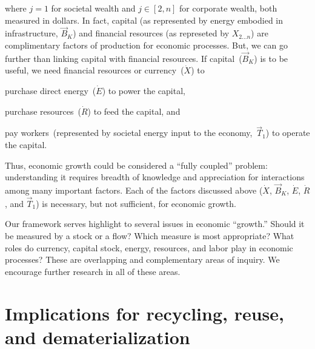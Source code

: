 \noindent{}where $j=1$ for societal wealth 
and $j \in [2,n]$ for corporate wealth, both measured in dollars.
In fact, capital (as represented by energy embodied in infrastructure, $\vec{B}_{K}$) and 
financial resources (as represeted by $X_{2 \ldots n}$) 
are complimentary factors of production for economic processes. 
But, we can go further than linking capital with financial resources.
If capital~($\vec{B}_{K}$) is to be useful, we need financial resources
or currency~($\dot{X}$) to 
\begin{itemize}
	\item{purchase direct energy~($\dot{E}$) to power the capital,
	\item{purchase resources~($\dot{R}$) to feed the capital, and}
	\item{pay workers~(represented 
	by societal energy input to the economy,~$\vec{T}_{1}$) 
	to operate the capital.}
} 
\end{itemize}

Thus, economic growth could be considered a ``fully coupled'' problem:
understanding it requires breadth of knowledge and appreciation for 
interactions among many important factors.
Each of the factors discussed above 
($\dot{X}$, $\vec{B}_{K}$, $\dot{E}$, $\dot{R}$, and $\vec{T}_{1}$)
is necessary, but not sufficient, for economic growth.

Our framework serves highlight to several issues in economic ``growth.'' 
Should it be measured by a stock or a flow? 
Which measure is most appropriate? 
What roles do currency, capital stock, energy, resources, and labor
play in economic processes?
These are overlapping and complementary areas of inquiry.
We encourage further research in all of these areas.


\section{Implications for recycling, reuse, and dematerialization}
\label{sec:recycling}



